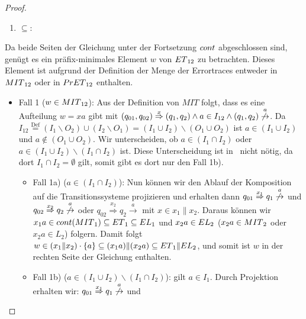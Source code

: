 \begin{proof}
  ~
  \begin{enumerate}
    \item \glqq $\subseteq$\grqq :
  \end{enumerate}
  Da beide Seiten der Gleichung unter der Fortsetzung $cont{}$ abgeschlossen sind, genügt es ein
  präfix-minimales Element $w$ von $ET{}_{12}$ zu betrachten. Dieses Element ist
  aufgrund der Definition der Menge der Errortraces entweder in $MIT{}_{12}$ oder in
  $PrET{}_{12}$ enthalten.\\
  \begin{itemize}
    \item Fall 1 ($w\in MIT{}_{12}$): Aus der Definition von $MIT$ folgt, dass es eine
  Aufteilung $w=xa$ gibt mit
  $(q_{01},q_{02})\overset{x}{\Rightarrow}(q_1,q_2)\wedge a\in I_{12}\wedge
  (q_1,q_2)\overset{a}{\not{\hspace{-0.1cm}\rightarrow}}$. Da
  $I_{12}\overset{\mathrm{Def}}{=}(I_1\backslash O_2)\cup (I_2\backslash O_1)=(I_1\cup
  I_2)\backslash (O_1\cup O_2)$ ist $a\in (I_1\cup I_2)$ und $a\notin (O_1\cup
  O_2)$. Wir unterscheiden, ob $a\in (I_1\cap I_2)$ oder $a\in
  (I_1\cup I_2)\backslash (I_1\cap I_2)$ ist. Diese Unterscheidung ist
  in~\cite{Vogler2014EIO} nicht nötig, da dort $I_1\cap I_2=\emptyset$ gilt,
  somit gibt es dort nur den Fall 1b).
  \begin{itemize}
    \item Fall 1a) ($a\in (I_1\cap I_2)$): Nun können wir den Ablauf der
      Komposition auf die Transitionssysteme projizieren und erhalten dann \oBdA{}
      $q_{01}\overset{x_1}{\Rightarrow} q_1
      \overset{a}{\not{\hspace{-0.1cm}\rightarrow}}$ und
      $q_{02}\overset{x_2}{\Rightarrow} q_2
      \overset{a}{\not{\hspace{-0.1cm}\rightarrow}}$ oder
      $q_{02}\overset{x_2}{\Rightarrow} q_2 \overset{a}{\rightarrow}$ mit $x\in
      x_1\|x_2$. Daraus können wir $x_1a\in cont{}(MIT{}_1)\subseteq ET{}_1\subseteq
      EL{}_1$ und $x_2a\in EL{}_2$ ($x_2a\in MIT{}_2$ oder $x_2a\in L_2$) folgern. Damit folgt $w\in
      (x_1\|x_2)\cdot\{a\}\subseteq (x_1a)\|(x_2a)\subseteq ET{}_1\|EL{}_2$, und
      somit ist $w$ in der rechten Seite der Gleichung enthalten.
  \item Fall 1b) ($a\in (I_1\cup I_2)\backslash(I_1\cap I_2)$): \OBdA{} gilt
      $a\in I_1$. Durch Projektion erhalten wir:
      $q_{01}\overset{x_1}{\Rightarrow} q_1
      \overset{a}{\not{\hspace{-0.1cm}\rightarrow}}$ und

\end{itemize}
\end{itemize}
\end{proof}
